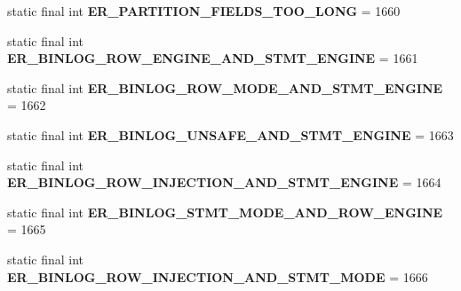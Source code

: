 \begin{DoxyCompactItemize}
static final int {\bfseries E\+R\+\_\+\+P\+A\+R\+T\+I\+T\+I\+O\+N\+\_\+\+F\+I\+E\+L\+D\+S\+\_\+\+T\+O\+O\+\_\+\+L\+O\+NG} = 1660
\item 
\mbox{\label{classcom_1_1mysql_1_1jdbc_1_1_mysql_error_numbers_adf11f0379baed522e145d1a0e807d682}} 
static final int {\bfseries E\+R\+\_\+\+B\+I\+N\+L\+O\+G\+\_\+\+R\+O\+W\+\_\+\+E\+N\+G\+I\+N\+E\+\_\+\+A\+N\+D\+\_\+\+S\+T\+M\+T\+\_\+\+E\+N\+G\+I\+NE} = 1661
\item 
\mbox{\label{classcom_1_1mysql_1_1jdbc_1_1_mysql_error_numbers_a1e7e9545ac81d39d423e55f7002948ed}} 
static final int {\bfseries E\+R\+\_\+\+B\+I\+N\+L\+O\+G\+\_\+\+R\+O\+W\+\_\+\+M\+O\+D\+E\+\_\+\+A\+N\+D\+\_\+\+S\+T\+M\+T\+\_\+\+E\+N\+G\+I\+NE} = 1662
\item 
\mbox{\label{classcom_1_1mysql_1_1jdbc_1_1_mysql_error_numbers_a431aaca63161a6ccddefa2fe1e6fa715}} 
static final int {\bfseries E\+R\+\_\+\+B\+I\+N\+L\+O\+G\+\_\+\+U\+N\+S\+A\+F\+E\+\_\+\+A\+N\+D\+\_\+\+S\+T\+M\+T\+\_\+\+E\+N\+G\+I\+NE} = 1663
\item 
\mbox{\label{classcom_1_1mysql_1_1jdbc_1_1_mysql_error_numbers_a843f560199d57b077a81f3578840b1c2}} 
static final int {\bfseries E\+R\+\_\+\+B\+I\+N\+L\+O\+G\+\_\+\+R\+O\+W\+\_\+\+I\+N\+J\+E\+C\+T\+I\+O\+N\+\_\+\+A\+N\+D\+\_\+\+S\+T\+M\+T\+\_\+\+E\+N\+G\+I\+NE} = 1664
\item 
\mbox{\label{classcom_1_1mysql_1_1jdbc_1_1_mysql_error_numbers_addc1ca356a7f31a2e7057a4c5e885f9e}} 
static final int {\bfseries E\+R\+\_\+\+B\+I\+N\+L\+O\+G\+\_\+\+S\+T\+M\+T\+\_\+\+M\+O\+D\+E\+\_\+\+A\+N\+D\+\_\+\+R\+O\+W\+\_\+\+E\+N\+G\+I\+NE} = 1665
\item 
\mbox{\label{classcom_1_1mysql_1_1jdbc_1_1_mysql_error_numbers_a5f0d92ecf305f423860c241f6149622e}} 
static final int {\bfseries E\+R\+\_\+\+B\+I\+N\+L\+O\+G\+\_\+\+R\+O\+W\+\_\+\+I\+N\+J\+E\+C\+T\+I\+O\+N\+\_\+\+A\+N\+D\+\_\+\+S\+T\+M\+T\+\_\+\+M\+O\+DE} = 1666
\item 
\mbox{\label{classcom_1_1mysql_1_1jdbc_1_1_mysql_error_numbers_a87ecf22f245a3c87c4a875f2648032c0}} 

\end{DoxyCompactItemize}
